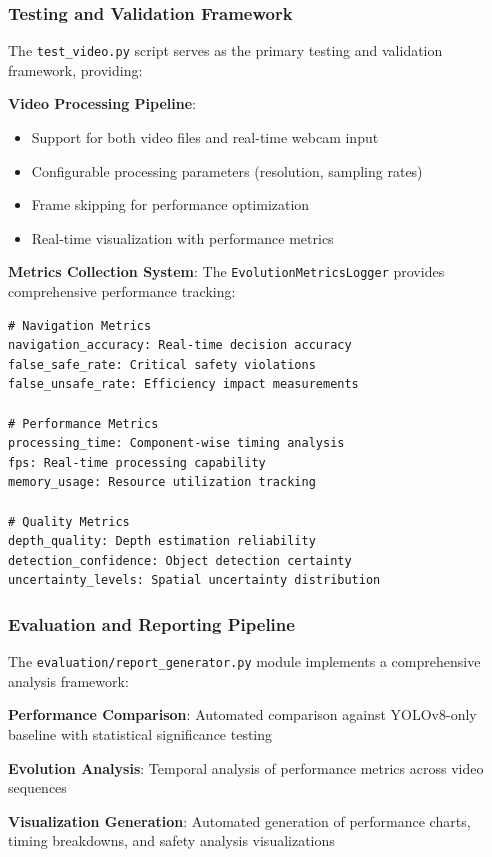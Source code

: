 \documentclass[12pt,oneside]{book}
\begin{document}
\subsubsection{Testing and Validation Framework}

The \texttt{test\_video.py} script serves as the primary testing and validation framework, providing:

\textbf{Video Processing Pipeline}:
\begin{itemize}
\item Support for both video files and real-time webcam input
\item Configurable processing parameters (resolution, sampling rates)
\item Frame skipping for performance optimization
\item Real-time visualization with performance metrics
\end{itemize}

\textbf{Metrics Collection System}:
The \texttt{EvolutionMetricsLogger} provides comprehensive performance tracking:

\begin{verbatim}
# Navigation Metrics
navigation_accuracy: Real-time decision accuracy
false_safe_rate: Critical safety violations
false_unsafe_rate: Efficiency impact measurements

# Performance Metrics
processing_time: Component-wise timing analysis
fps: Real-time processing capability
memory_usage: Resource utilization tracking

# Quality Metrics
depth_quality: Depth estimation reliability
detection_confidence: Object detection certainty
uncertainty_levels: Spatial uncertainty distribution
\end{verbatim}

\subsubsection{Evaluation and Reporting Pipeline}

The \texttt{evaluation/report\_generator.py} module implements a comprehensive analysis framework:

\textbf{Performance Comparison}: Automated comparison against YOLOv8-only baseline with statistical significance testing

\textbf{Evolution Analysis}: Temporal analysis of performance metrics across video sequences

\textbf{Visualization Generation}: Automated generation of performance charts, timing breakdowns, and safety analysis visualizations
\end{document}
